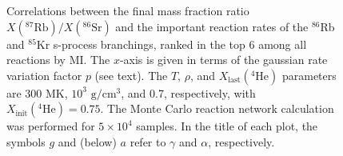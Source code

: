 \begin{figure}[t]
\begin{subfigure}[b]{0.495\textwidth}
\end{subfigure}
\caption{\label{fig:Correlations_87Rb86Sr_ng}Correlations between the final mass fraction ratio $X(^{87}\mathrm{Rb})/X(^{86}\mathrm{Sr})$ and the important reaction rates of the $^{86}$Rb and $^{85}$Kr s-process branchings, ranked in the top 6 among all reactions by MI. The $x$-axis is given in terms of the gaussian rate variation factor $p$ (see text). The $T$, $\rho$, and $X_{\mathrm{last}}(^{4}\mathrm{He})$ parameters are 300 MK, $10^{3}$ $\mathrm{g}/\mathrm{cm}^{3}$, and 0.7, respectively, with $X_{\mathrm{init}}(^{4}\mathrm{He}) = 0.75$. The Monte Carlo reaction network calculation was performed for $5 \times 10^{4}$ samples. In the title of each plot, the symbols $g$ and (below) $a$ refer to $\gamma$ and $\alpha$, respectively.}
\end{figure}

